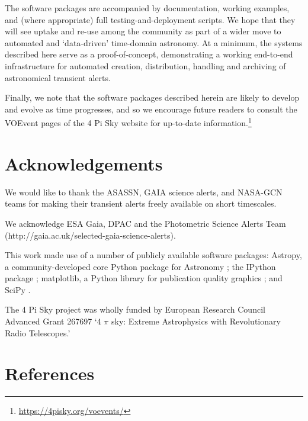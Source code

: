\documentclass[5p,authoryear]{elsarticle}
\begin{document}
The software packages are accompanied by documentation, working examples, and (where appropriate) full testing-and-deployment scripts. We hope that they will see uptake and re-use among the community as part of a wider move to automated and `data-driven' time-domain astronomy. At a minimum, the systems described here serve as a proof-of-concept, demonstrating a working end-to-end infrastructure for automated creation, distribution, handling and archiving of astronomical transient alerts.

Finally, we note that the software packages described herein are likely to develop and evolve as time progresses, and so we encourage future readers to consult the VOEvent pages of the 4 Pi Sky website for up-to-date information.\footnote{\url{https://4pisky.org/voevents/}}




\section*{Acknowledgements}

We would like to thank the ASASSN, GAIA science alerts, and NASA-GCN teams for making their transient alerts freely available on short timescales.

We acknowledge ESA Gaia, DPAC and the Photometric Science Alerts Team (http://gaia.ac.uk/selected-gaia-science-alerts).

This work made use of a number of publicly available software packages: Astropy, a community-developed core Python package for Astronomy \citep{Astropy2013}; the IPython package \citep{Perez2007}; matplotlib, a Python library for publication quality graphics \citep{Hunter2007}; and SciPy \citep{jones_scipy_2001}. 

The 4 Pi Sky project was wholly funded by European Research Council Advanced Grant 267697 
`4 $\pi$ sky: Extreme Astrophysics with Revolutionary Radio Telescopes.’

\section*{References}



\end{document}
